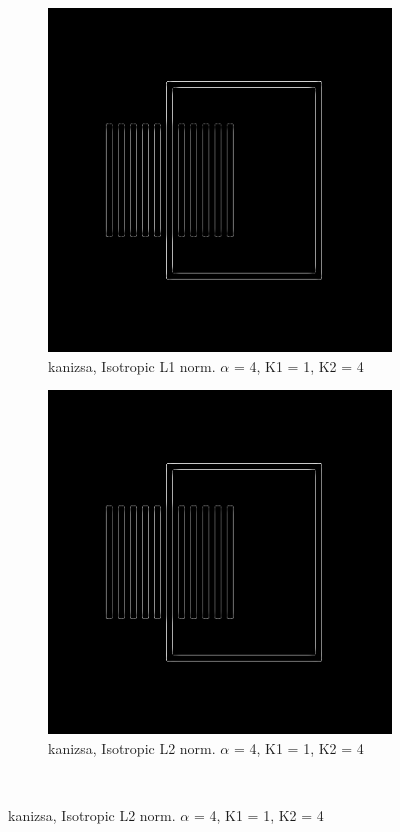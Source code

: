 \begin{figure}[H]
\centering

  \begin{subfigure}{.7\textwidth}
    \centering
    \includegraphics[width=.9\textwidth]{./canny/kanizsa_L1_a4_k11_k24}
    \caption{kanizsa, Isotropic L1 norm. $\alpha$ = 4, K1 = 1, K2 = 4}
    \label{fig:kanizsa_L1_a4_k11_k24}
  \end{subfigure}%
  
  \begin{subfigure}{.7\textwidth}
    \centering
    \includegraphics[width=.9\textwidth]{./canny/kanizsa_L2_a4_k11_k24}
    \caption{kanizsa, Isotropic L2 norm. $\alpha$ = 4, K1 = 1, K2 = 4}
    \label{fig:kanizsa_L2_a4_k11_k24}
  \end{subfigure}\\%
 \end{figure}

